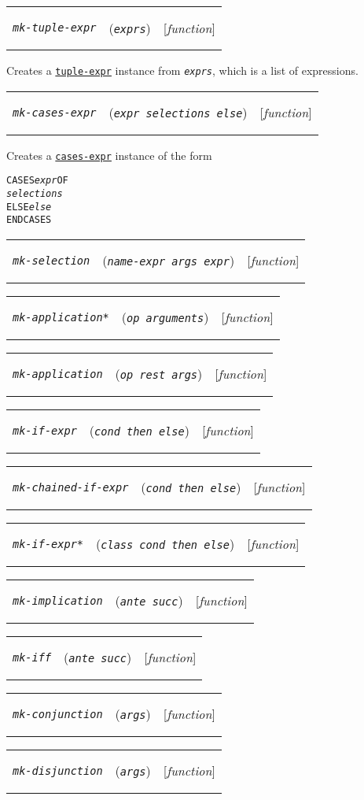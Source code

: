 \documentclass[12pt]{book}
\makeatletter
\def\amprest{{\smaller\sc {\smaller\smaller \&}rest\ }}
\newenvironment{function}[3]%
{\par\noindent\begin{boxedminipage}{\textwidth}%
 \par\noindent\begin{tabularx}{\linewidth}{l>{\raggedright}Xr}%
 \functionhtgt{#1}&(\texttt{\textit{#2}})&[\emph{#3}]%
 \end{tabularx}\par\flushright\begin{minipage}{.97\textwidth}}
{\end{minipage}\end{boxedminipage}}
\newcommand{\functionarg}[1]{\texttt{\textit{#1}}}
\newcommand{\functionnm}[1]{\texttt{\textit{#1}}}
\newcommand{\functionhtgt}[1]{\hypertarget{#1}{\functionnm{#1}}\index{#1@\functionnm{#1}|underline}}
\newenvironment{lispfunction}[2]%
{\begin{function}{#1}{#2}{function}}{\end{function}}
\newcommand{\classnm}[1]{\texttt{\textup{#1}}}
\newcommand{\classhln}[1]{\hyperlink{#1}{\classnm{#1}}}
\makeatother
\begin{document}
\begin{lispfunction}{mk-tuple-expr}{exprs}
Creates a \classhln{tuple-expr} instance from \functionarg{exprs}, which
is a list of expressions.
\end{lispfunction}

\begin{lispfunction}{mk-cases-expr}{expr selections else}
Creates a \classhln{cases-expr} instance of the form
\begin{alltt}
  CASES \functionarg{expr} OF
    \functionarg{selections}
    ELSE \functionarg{else}
  ENDCASES
\end{alltt}
\end{lispfunction}

\begin{lispfunction}{mk-selection}{name-expr args expr}
\end{lispfunction}

\begin{lispfunction}{mk-application*}{op arguments}
\end{lispfunction}
                 
\begin{lispfunction}{mk-application}{op \amprest args}
\end{lispfunction}

\begin{lispfunction}{mk-if-expr}{cond then else}
\end{lispfunction}

\begin{lispfunction}{mk-chained-if-expr}{cond then else}
\end{lispfunction}

\begin{lispfunction}{mk-if-expr*}{class cond then else}
\end{lispfunction}

\begin{lispfunction}{mk-implication}{ante succ}
\end{lispfunction}

\begin{lispfunction}{mk-iff}{ante succ}
\end{lispfunction}

\begin{lispfunction}{mk-conjunction}{args}
\end{lispfunction}

\begin{lispfunction}{mk-disjunction}{args}
\end{lispfunction}
\end{document}

